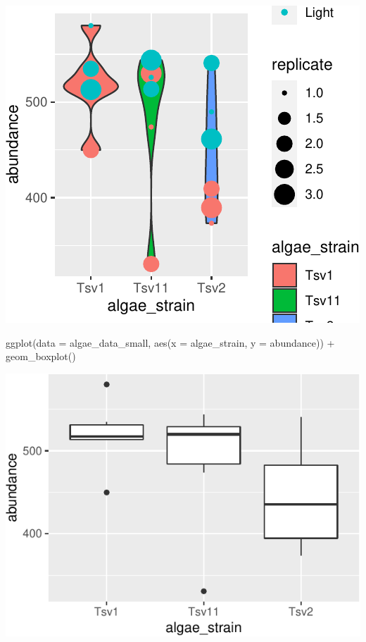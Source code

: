 \documentclass[
]{krantz}
\newenvironment{Shaded}{\begin{snugshade}}{\end{snugshade}}
\newcommand{\AttributeTok}[1]{\textcolor[rgb]{0.77,0.63,0.00}{#1}}
\newcommand{\FunctionTok}[1]{\textcolor[rgb]{0.00,0.00,0.00}{#1}}
\newcommand{\NormalTok}[1]{#1}
\newcommand{\SpecialCharTok}[1]{\textcolor[rgb]{0.00,0.00,0.00}{#1}}
\begin{document}
\begin{center}\includegraphics[width=0.8\linewidth]{index_files/figure-latex/unnamed-chunk-28-1} \end{center}

\begin{Shaded}
\begin{Highlighting}[]
\FunctionTok{ggplot}\NormalTok{(}\AttributeTok{data =}\NormalTok{ algae\_data\_small, }\FunctionTok{aes}\NormalTok{(}\AttributeTok{x =}\NormalTok{ algae\_strain, }\AttributeTok{y =}\NormalTok{ abundance)) }\SpecialCharTok{+}
  \FunctionTok{geom\_boxplot}\NormalTok{()}
\end{Highlighting}
\end{Shaded}

\begin{center}\includegraphics[width=0.8\linewidth]{index_files/figure-latex/unnamed-chunk-29-1} \end{center}
\end{document}
